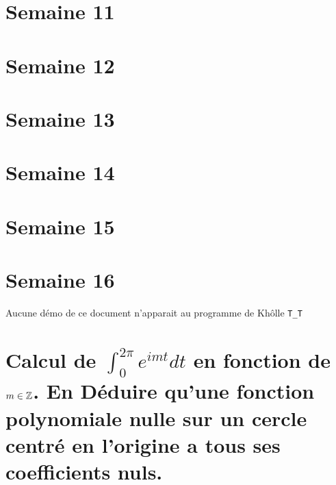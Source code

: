 \documentclass{article}
\begin{document}

\section{Semaine 11} 
\label{sec:S11}


\section{Semaine 12} 
\label{sec:S12}


\section{Semaine 13} 
\label{sec:S13}


\section{Semaine 14} 
\label{sec:S14}


\section{Semaine 15} 
\label{sec:S15}


\section{Semaine 16} 
\label{sec:S16}



Aucune démo de ce document n'apparait au programme de Khôlle \verb|T_T|

\section{Calcul de $\int_0^{2\pi}e^{imt}dt$ en fonction de $m \in \mathbb Z$. En Déduire qu'une fonction polynomiale nulle sur un cercle centré en l'origine a tous ses coefficients nuls.}
\end{document}
